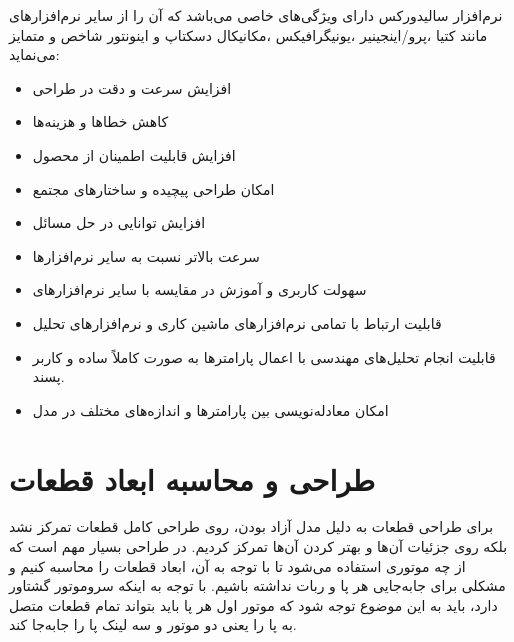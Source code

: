 نرم‌افزار سالیدورکس دارای ویژگی‌های خاصی می‌باشد که آن را از سایر نرم‌افزارهای 
\unskip{}
مانند کتیا
\unskip{}
،پرو/اینجینیر
\unskip{}
،یونیگرافیکس
\unskip{} 
،مکانیکال دسکتاپ
\unskip{} 
و اینونتور
\unskip{} 
شاخص و متمایز می‌نماید:
\begin{itemize}
	\item افزایش سرعت و دقت در طراحی
	\item کاهش خطاها و هزینه‌ها
	\item افزایش قابلیت اطمینان از محصول
	\item امکان طراحی پیچیده و ساختارهای مجتمع
	\item افزایش توانایی در حل مسائل
	\item سرعت بالاتر نسبت به سایر نرم‌افزارها
	\item سهولت کاربری و آموزش در مقایسه با سایر نرم‌افزارهای 
	\item قابلیت ارتباط با تمامی نرم‌افزارهای ماشین کاری  و نرم‌افزارهای تحلیل 
	\item قابلیت انجام تحلیل‌های مهندسی با اعمال پارامترها به صورت کاملاً ساده و کاربر پسند.
	\item امکان معادله‌نویسی  بین پارامترها و انداز‌ه‌های مختلف در مدل
\end{itemize}

\section{طراحی و محاسبه ابعاد قطعات}
برای طراحی قطعات به دلیل مدل آزاد بودن، روی طراحی کامل قطعات تمرکز نشد بلکه روی جزئیات آن‌ها و بهتر کردن آن‌ها تمرکز کردیم. در طراحی بسیار مهم است که از چه موتوری استفاده می‌شود تا با توجه به آن، ابعاد قطعات را محاسبه کنیم و مشکلی برای جابه‌جایی هر پا و ربات نداشته باشیم.
با توجه به اینکه سروموتور گشتاور  دارد، باید به این موضوع توجه شود که موتور اول هر پا باید بتواند تمام قطعات متصل به پا را یعنی دو موتور و سه لینک پا را جابه‌جا کند.

\newpage
